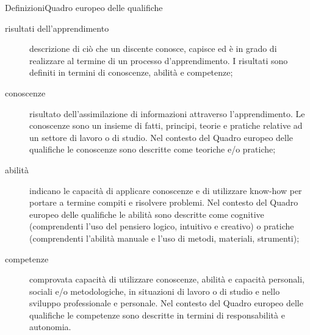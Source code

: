 \documentclass[italian]{beamer}
\begin{document}
		
		
		

\begin{frame}[allowframebreaks]{Definizioni}{Quadro europeo delle qualifiche}
	\begin{description}
		\item[risultati dell'apprendimento] descrizione di ci\`o
		che un discente conosce, capisce ed \`e in grado di
		realizzare al termine di un processo d'apprendimento.
		I risultati sono definiti in termini di conoscenze,
		abilit\`a e competenze;
		
		\item[conoscenze] risultato dell'assimilazione di
		informazioni attraverso l'apprendimento. Le
		conoscenze sono un insieme di fatti, principi, teorie
		e pratiche relative ad un settore di lavoro o di studio.
		Nel contesto del Quadro europeo delle qualifiche
		le conoscenze sono descritte come teoriche e/o
		pratiche;
		
		\item[abilit\`a] indicano le capacit\`a di applicare
		conoscenze e di utilizzare know-how per portare a
		termine compiti e risolvere problemi. Nel contesto
		del Quadro europeo delle qualifiche le abilit\`a sono
		descritte come cognitive (comprendenti l'uso del
		pensiero logico, intuitivo e creativo) o pratiche
		(comprendenti l'abilit\`a manuale e l'uso di metodi,
		materiali, strumenti);
		
		\item[competenze] comprovata capacit\`a di utilizzare
		conoscenze, abilit\`a e capacit\`a personali, sociali
		e/o metodologiche, in situazioni di lavoro o di
		studio e nello sviluppo professionale e personale.
		Nel contesto del Quadro europeo delle qualifiche
		le competenze sono descritte in termini di
		responsabilit\`a e autonomia.
	\end{description}
\end{frame}
\end{document}
